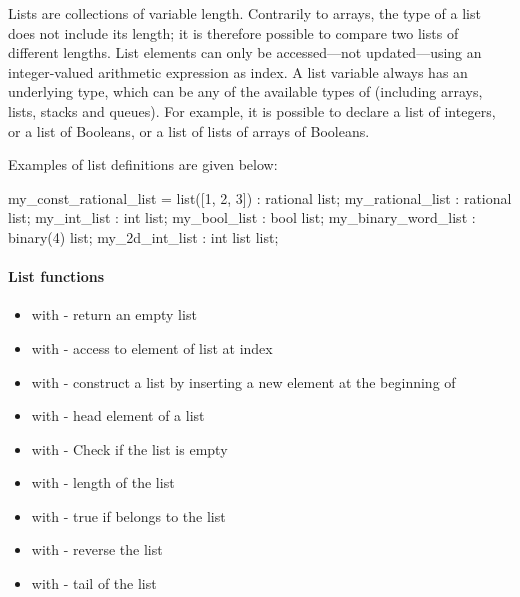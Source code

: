 Lists are collections of variable length.
Contrarily to arrays, the type of a list does not include its length; it is therefore possible to compare two lists of different lengths.
List elements can only be accessed---not updated---using an integer-valued arithmetic expression as index.
A list variable always has an underlying type, which can be any of the available types of \imitator{} (including arrays, lists, stacks and queues).
For example, it is possible to declare a list of integers, or a list of Booleans, or a list of lists of arrays of Booleans.

Examples of list definitions are given below:

\begin{IMITATORmodel}
	my_const_rational_list = list([1, 2, 3]) : rational list;
	my_rational_list 			: rational list;
	my_int_list						: int list;
	my_bool_list        	: bool list;
	my_binary_word_list 	: binary(4) list;
	my_2d_int_list      	: int list list;
\end{IMITATORmodel}


\paragraph{List functions}

\begin{itemize}
	\item {} with  - return an empty list
	\item {} with  - access to element of list  at index 
	\item \label{item:lbl-list_cons}  with  - construct a list by inserting a new element  at the beginning of 
	\item \label{item:lbl-list_hd}  with  - head element of a list 
	\item \label{item:lbl-list_is_empty}  with  - Check if the list  is empty
	\item \label{item:lbl-list_length}  with  - length of the list 
	\item \label{item:lbl-list_mem}  with  - true if  belongs to the list~
	\item \label{item:lbl-list_rev}  with  - reverse the list~
	\item \label{item:lbl-list_tl}  with  - tail of the list 
\end{itemize}

